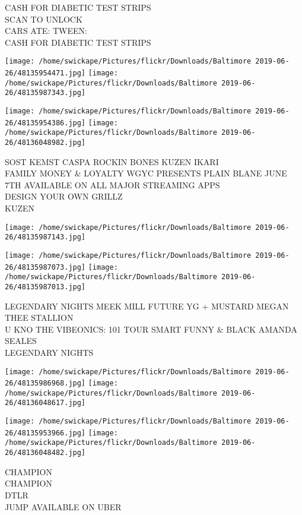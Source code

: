 \documentclass[10pt,letterpaper]{article}
\begin{document}
CASH FOR DIABETIC TEST STRIPS\\
SCAN TO UNLOCK\\
CARS ATE: TWEEN:\\
CASH FOR DIABETIC TEST STRIPS
\pagebreak

\texttt{[image: /home/swickape/Pictures/flickr/Downloads/Baltimore 2019-06-26/48135954471.jpg]}
\texttt{[image: /home/swickape/Pictures/flickr/Downloads/Baltimore 2019-06-26/48135987343.jpg]}

\texttt{[image: /home/swickape/Pictures/flickr/Downloads/Baltimore 2019-06-26/48135954386.jpg]}
\texttt{[image: /home/swickape/Pictures/flickr/Downloads/Baltimore 2019-06-26/48136048982.jpg]}

SOST KEMST CASPA ROCKIN BONES KUZEN IKARI\\
FAMILY MONEY \& LOYALTY WGYC PRESENTS PLAIN BLANE JUNE 7TH AVAILABLE ON ALL MAJOR STREAMING APPS\\
DESIGN YOUR OWN GRILLZ\\
KUZEN
\pagebreak

\texttt{[image: /home/swickape/Pictures/flickr/Downloads/Baltimore 2019-06-26/48135987143.jpg]}

\vspace{0.25in}
\texttt{[image: /home/swickape/Pictures/flickr/Downloads/Baltimore 2019-06-26/48135987073.jpg]}
\texttt{[image: /home/swickape/Pictures/flickr/Downloads/Baltimore 2019-06-26/48135987013.jpg]}

LEGENDARY NIGHTS MEEK MILL FUTURE YG + MUSTARD MEGAN THEE STALLION\\
U KNO THE VIBEONICS: 101 TOUR SMART FUNNY \& BLACK AMANDA SEALES\\
LEGENDARY NIGHTS
\pagebreak

\texttt{[image: /home/swickape/Pictures/flickr/Downloads/Baltimore 2019-06-26/48135986968.jpg]}
\texttt{[image: /home/swickape/Pictures/flickr/Downloads/Baltimore 2019-06-26/48136048617.jpg]}

\texttt{[image: /home/swickape/Pictures/flickr/Downloads/Baltimore 2019-06-26/48135953966.jpg]}
\texttt{[image: /home/swickape/Pictures/flickr/Downloads/Baltimore 2019-06-26/48136048482.jpg]}

CHAMPION\\
CHAMPION\\
DTLR\\
JUMP AVAILABLE ON UBER
\pagebreak
\end{document}
